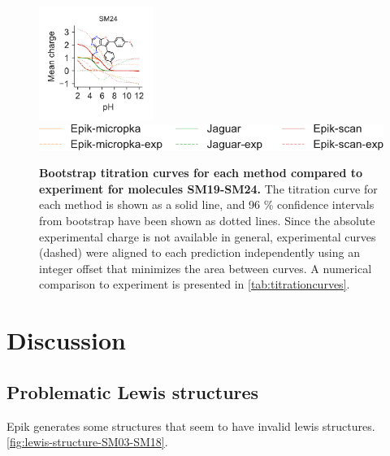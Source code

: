 \documentclass[9pt,lineno,final]{elife}
\begin{document}
\begin{figure}[hbtp]
	\includegraphics[width=0.33\textwidth]{Reports/SM24-titrationcurve-views.pdf}	 \\
    \includegraphics[]{Reports/overview-legend.pdf}

	\caption{{\bf Bootstrap titration curves for each method compared to experiment for molecules SM19-SM24.} The titration curve for each method is shown as a solid line, and 96 \% confidence intervals from bootstrap have been shown as dotted lines. Since the absolute experimental charge is not available in general, experimental curves (dashed) were aligned to each prediction independently using an integer offset that minimizes the area between curves. A numerical comparison to experiment is presented in \cref{tab:titrationcurves}.
	\label{fig:charge-curves3}}
	

\end{figure}

\section{Discussion}


\subsection{Problematic Lewis structures}
Epik generates some structures that seem to have invalid lewis structures.
\cref{fig:lewis-structure-SM03-SM18}.
\end{document}
